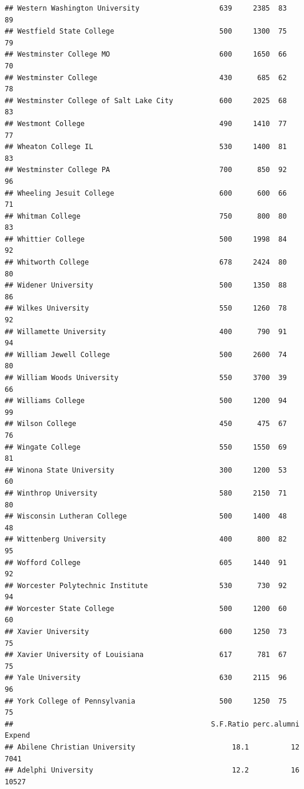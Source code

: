 \documentclass[
]{article}
\begin{document}
\begin{verbatim}
## Western Washington University                   639     2385  83       89
## Westfield State College                         500     1300  75       79
## Westminster College MO                          600     1650  66       70
## Westminster College                             430      685  62       78
## Westminster College of Salt Lake City           600     2025  68       83
## Westmont College                                490     1410  77       77
## Wheaton College IL                              530     1400  81       83
## Westminster College PA                          700      850  92       96
## Wheeling Jesuit College                         600      600  66       71
## Whitman College                                 750      800  80       83
## Whittier College                                500     1998  84       92
## Whitworth College                               678     2424  80       80
## Widener University                              500     1350  88       86
## Wilkes University                               550     1260  78       92
## Willamette University                           400      790  91       94
## William Jewell College                          500     2600  74       80
## William Woods University                        550     3700  39       66
## Williams College                                500     1200  94       99
## Wilson College                                  450      475  67       76
## Wingate College                                 550     1550  69       81
## Winona State University                         300     1200  53       60
## Winthrop University                             580     2150  71       80
## Wisconsin Lutheran College                      500     1400  48       48
## Wittenberg University                           400      800  82       95
## Wofford College                                 605     1440  91       92
## Worcester Polytechnic Institute                 530      730  92       94
## Worcester State College                         500     1200  60       60
## Xavier University                               600     1250  73       75
## Xavier University of Louisiana                  617      781  67       75
## Yale University                                 630     2115  96       96
## York College of Pennsylvania                    500     1250  75       75
##                                               S.F.Ratio perc.alumni Expend
## Abilene Christian University                       18.1          12   7041
## Adelphi University                                 12.2          16  10527

\end{verbatim}
\end{document}
